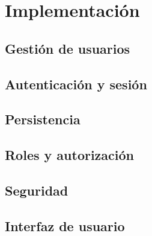 \chapter{Implementación}
\label{cap:implementacion}

\section{Gestión de usuarios}

\section{Autenticación y sesión}

\section{Persistencia}

\section{Roles y autorización}

\section{Seguridad}

\section{Interfaz de usuario}
